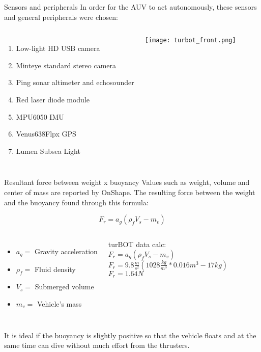 \begin{frame}[c]{Sensors and peripherals}
  \transboxout[duration=0.5]
  In order for the AUV to act autonomously, these sensors and general peripherals were chosen:
  \begin{columns}
      \begin{enumerate}
        \item Low-light HD USB camera
        \item Minteye standard stereo camera
        \item Ping sonar altimeter and echosounder
        \item Red laser diode module
        \item MPU6050 IMU
        \item Venus638Flpx GPS
        \item Lumen Subsea Light
      \end{enumerate}
      \texttt{[image: turbot\_front.png]}      
  \end{columns}
\end{frame}


\begin{frame}[c]{Resultant force between weight x buoyancy}
  Values such as weight, volume and center of mass are reported by OnShape. The resulting force between the weight and the buoyancy found through this formula:
  
  \begin{equation} 
    F_{r} = a_{g}(\rho_{f} V_{s} - m_{v})
  \end{equation}
  \begin{columns}
      \begin{itemize}
        \item $a_{g} =$ Gravity acceleration
        \item $\rho_{f} =$ Fluid density
        \item $V_{s} =$ Submerged volume
        \item $m_{v} =$ Vehicle's mass
      \end{itemize}
      turBOT data calc: \\
      $F_{r} = a_{g}(\rho_{f} V_{s} - m_{v})$ \\
      $F_{r} = 9.8 \frac{m}{s^2}(1028 \frac{kg}{m^3}* 0.016 m^3 - 17 kg)$ \\
      $F_{r} = 1.64 N$
  \end{columns}
  
  It is ideal if the buoyancy is slightly positive so that the vehicle floats and at the same time can dive without much effort from the thrusters.  
\end{frame}

